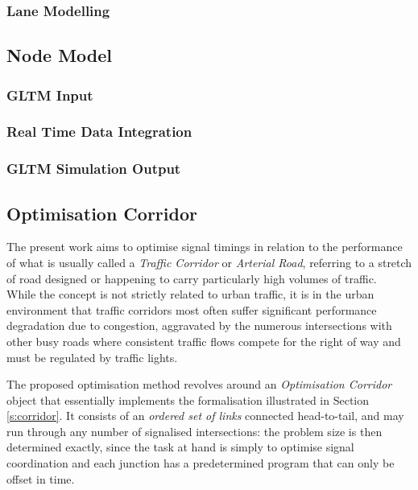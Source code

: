 




\subsubsection{Lane Modelling}

\subsection{Node Model}

\subsubsection{GLTM Input}

\subsubsection{Real Time Data Integration}

\subsubsection{GLTM Simulation Output} \label{s:output}

\subsection{Optimisation Corridor}
The present work aims to optimise signal timings in relation to the performance of what is usually called a \emph{Traffic Corridor} or \emph{Arterial Road}, referring to a stretch of road designed or happening to carry particularly high volumes of traffic. \\
While the concept is not strictly related to urban traffic, it is in the urban environment that traffic corridors most often suffer significant performance degradation due to congestion, aggravated by the numerous intersections with other busy roads where consistent traffic flows compete for the right of way and must be regulated by traffic lights.

The proposed optimisation method revolves around an \emph{Optimisation Corridor} object that essentially implements the formalisation illustrated in Section \ref{s:corridor}. It consists of an \emph{ordered set of links} connected head-to-tail, and may run through any number of signalised intersections: the problem size is then determined exactly, since the task at hand is simply to optimise signal coordination and each junction has a predetermined program that can only be offset in time.

